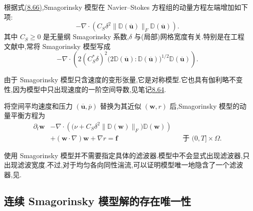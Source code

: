\begin{note}[Smagorinsky 模型]
\label{note:smagorinsky-model}
根据式\hyperref[eq:smagorinsky-turbulent-viscosity]{(8.66)},Smagorinsky 模型在 Navier--Stokes 方程组的动量方程左端增加如下项:
\begin{equation}\label{eq:smagorinsky-filter-width}
 -\nabla\cdot\left(
   C_S\delta^2
   \|\mathbb{D}(\overline{\bm{u}})\|_F
   \mathbb{D}(\overline{\bm{u}})
  \right).
\end{equation}
其中 $C_S\ge0$ 是无量纲 Smagorinsky 系数,$\delta$ 与(局部)网格宽度有关.特别是在工程文献中,常将 Smagorinsky 模型写成
\begin{equation}\label{eq:smagorinsky-engineering-term}
 -\nabla\cdot\left(
   2(C_S^\ast\delta)^2
   \bigl(
    2\mathbb{D}(\overline{\bm{u}})
      :\mathbb{D}(\overline{\bm{u}})
   \bigr)^{1/2}
   \mathbb{D}(\overline{\bm{u}})
  \right).
\end{equation}

由于 Smagorinsky 模型只含速度的变形张量,它是对称模型.它也具有伽利略不变性,因为模型中只出现速度的一阶空间导数,见笔记\hyperref[note:sgs-stress-properties]{8.64}.

将空间平均速度和压力 $(\overline{\bm{u}},\overline{p})$ 替换为其近似 $(\bm{w},r)$ 后,Smagorinsky 模型的动量平衡方程为
\begin{equation}\label{eq:smagorinsky-momentum-balance}
\begin{aligned}
 \partial_t\bm{w}
  &-\nabla\cdot\left(
    \bigl(\nu+C_S\delta^2
       \|\mathbb{D}(\bm{w})\|_F\bigr)
    \mathbb{D}(\bm{w})
   \right)\\
  &+(\bm{w}\cdot\nabla)\bm{w}
   +\nabla r
   =\bm{f}
   &&\text{于 }(0,T]\times\Omega.
\end{aligned}
\end{equation}
\end{note}

\begin{note}
\label{note:smagorinsky-filter}
使用 Smagorinsky 模型并不需要指定具体的滤波器.模型中不会显式出现滤波器,只出现滤波宽度.不过,对于均匀各向同性湍流,可以证明模型唯一地隐含了一个滤波器,见\textcite[第 13.4.3 节]{Pope2000}.
\end{note}
\subsection{连续 Smagorinsky 模型解的存在唯一性}
\label{subsec:smagorinsky-existence-uniqueness}
\label{sec:smagorinsky-analysis}


